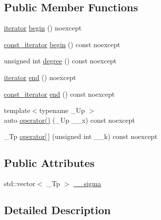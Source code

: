 \subsection*{Public Member Functions}
\begin{DoxyCompactItemize}
\item 
\hyperlink{struct____gnu__cxx_1_1____stirling__1__t_a4dad153706e77f66c38d2a620230ac35}{iterator} \hyperlink{struct____gnu__cxx_1_1____stirling__1__t_a9ad82f8b4da558a56d79e6ba82eb0ac6}{begin} () noexcept
\item 
\hyperlink{struct____gnu__cxx_1_1____stirling__1__t_a2b4e459dac02038428602f6315b97941}{const\+\_\+iterator} \hyperlink{struct____gnu__cxx_1_1____stirling__1__t_ac3969e29b4400ce584d50f1856e2f823}{begin} () const noexcept
\item 
unsigned int \hyperlink{struct____gnu__cxx_1_1____stirling__1__t_a5deb39674b9b08887f6ce429366fb04a}{degree} () const noexcept
\item 
\hyperlink{struct____gnu__cxx_1_1____stirling__1__t_a4dad153706e77f66c38d2a620230ac35}{iterator} \hyperlink{struct____gnu__cxx_1_1____stirling__1__t_a2684a7da6d924ec5bb8b3ebfab00adad}{end} () noexcept
\item 
\hyperlink{struct____gnu__cxx_1_1____stirling__1__t_a2b4e459dac02038428602f6315b97941}{const\+\_\+iterator} \hyperlink{struct____gnu__cxx_1_1____stirling__1__t_a300ecff91bda7b2ff497e05174269ef9}{end} () const noexcept
\item 
{\footnotesize template$<$typename \+\_\+\+Up $>$ }\\auto \hyperlink{struct____gnu__cxx_1_1____stirling__1__t_a3db314b862f56a3b1c5600124e6568e9}{operator()} (\+\_\+\+Up \+\_\+\+\_\+x) const noexcept
\item 
\+\_\+\+Tp \hyperlink{struct____gnu__cxx_1_1____stirling__1__t_a71c10533ee2313b3cbb04b243275ff20}{operator\mbox{[}$\,$\mbox{]}} (unsigned int \+\_\+\+\_\+k) const noexcept
\end{DoxyCompactItemize}
\subsection*{Public Attributes}
\begin{DoxyCompactItemize}
\item 
std\+::vector$<$ \+\_\+\+Tp $>$ \hyperlink{struct____gnu__cxx_1_1____stirling__1__t_ad1030ad294ff5ff3a7f433861c933d04}{\+\_\+\+\_\+sigma}
\end{DoxyCompactItemize}


\subsection{Detailed Description}
